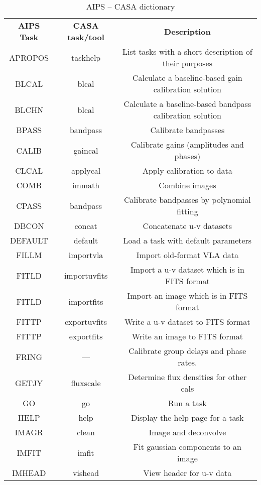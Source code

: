 \vspace{5mm}
\begin{table}[ht]
\caption[AIPS -- CASA dictionary]
        {\label{table:aips}AIPS -- CASA dictionary}
\begin{center}
\begin{tabular}{|c|c|c|} \hline
{\bf AIPS Task} &  {\bf CASA task/tool}     &  {\bf Description}   \\
APROPOS  & taskhelp 	 & List tasks with a short description of their purposes\\
BLCAL 	 & blcal   	 & Calculate a baseline-based gain calibration solution\\
BLCHN 	 & blcal   	 & Calculate a baseline-based bandpass calibration solution\\
BPASS 	 & bandpass 	 & Calibrate bandpasses\\
CALIB 	 & gaincal 	 & Calibrate gains (amplitudes and phases)\\
CLCAL 	 & applycal 	 & Apply calibration to data\\
COMB 	 & immath  	 & Combine images\\
CPASS 	 & bandpass   	 & Calibrate bandpasses by polynomial fitting\\
DBCON 	 & concat 	         & Concatenate u-v datasets\\
DEFAULT	 & default 	 & Load a task with default parameters\\
FILLM 	 & importvla 	 & Import old-format VLA data\\
FITLD 	 & importuvfits 	 & Import a u-v dataset which is in FITS format\\
FITLD 	 & importfits 	 & Import an image which is in FITS format\\
FITTP 	 & exportuvfits 	 & Write a u-v dataset to FITS format\\
FITTP 	 & exportfits 	 & Write an image to FITS format\\
FRING 	 & ---     	 & Calibrate group delays and phase rates.\\
GETJY 	 & fluxscale 	 & Determine flux densities for other cals\\
GO 	 & go      	 & Run a task\\
HELP 	 & help 	         & Display the help page for a task\\
IMAGR 	 & clean 	         & Image and deconvolve\\
IMFIT 	 & imfit    	 & Fit gaussian components to an image\\
IMHEAD 	 & vishead 	 & View header for u-v data\\

\end{tabular}
\end{center}
\end{table}
